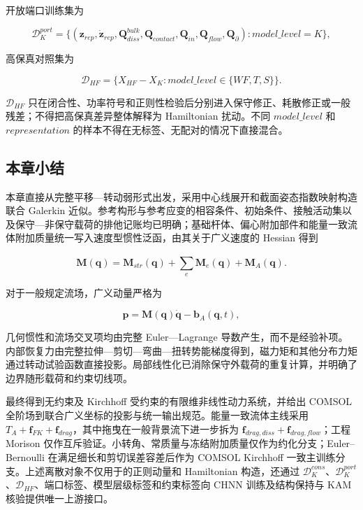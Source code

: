 开放端口训练集为

\begin{equation}
\label{eq:galerkin-2-125}
\mathcal{D}_{K}^{port} = \{\left( \mathbf{z}_{rep},{\dot{\mathbf{z}}}_{rep},\mathbf{Q}_{diss}^{bulk},\mathbf{Q}_{contact},\mathbf{Q}_{in},\mathbf{Q}_{flow},\mathbf{Q}_{\partial} \right):model\_ level = K\},
\end{equation}

高保真对照集为

\begin{equation}
\label{eq:galerkin-2-126}
\mathcal{D}_{HF} = \{ X_{HF} - X_{K}:model\_ level \in \{ WF,T,S\}\}.
\end{equation}

\(\mathcal{D}_{HF}\) 只在闭合性、功率符号和正则性检验后分别进入保守修正、耗散修正或一般残差；不得把高保真差异整体解释为 Hamiltonian 扰动。不同 \(model\_ level\) 和 \(representation\) 的样本不得在无标签、无配对的情况下直接混合。

\subsection{本章小结}\label{sec:galerkin-2-12}

本章直接从完整平移---转动弱形式出发，采用中心线展开和截面姿态指数映射构造联合 Galerkin 近似。参考构形与参考应变的相容条件、初始条件、接触活动集以及保守---非保守载荷的排他记账均已明确；基础杆体、偏心附加部件和能量一致流体附加质量统一写入速度型惯性泛函，由其关于广义速度的 Hessian 得到

\begin{equation}
\label{eq:galerkin-2-127}
\mathbf{M}\left( \mathbf{q} \right) = \mathbf{M}_{str}\left( \mathbf{q} \right) + \sum_{e}^{}\mathbf{M}_{e}\left( \mathbf{q} \right) + \mathbf{M}_{A}\left( \mathbf{q} \right).
\end{equation}

对于一般规定流场，广义动量严格为

\begin{equation}
\label{eq:galerkin-2-128}
\mathbf{p} = \mathbf{M}\left( \mathbf{q} \right)\dot{\mathbf{q}} - \mathbf{b}_{A}\left( \mathbf{q},t \right),
\end{equation}

几何惯性和流场交叉项均由完整 Euler---Lagrange 导数产生，而不是经验补项。内部恢复力由完整拉伸---剪切---弯曲---扭转势能梯度得到，磁力矩和其他分布力矩通过转动试验函数直接投影。局部线性化已消除保守外载荷的重复计算，并明确了边界随形载荷和约束切线项。

最终得到无约束及 Kirchhoff 受约束的有限维非线性动力系统，并给出 COMSOL 全阶场到联合广义坐标的投影与统一输出规范。能量一致流体主线采用 \(T_{A} + \mathbf{f}_{FK} + \mathbf{f}_{drag}\)，其中拖曳在一般背景流下进一步拆为 \(\mathbf{f}_{drag,diss} + \mathbf{f}_{drag,flow}\)；工程 Morison 仅作互斥验证。小转角、常质量与冻结附加质量仅作为约化分支；Euler--Bernoulli 在满足细长和剪切误差容差后作为 COMSOL Kirchhoff 一致主训练分支。上述离散对象不仅用于的正则动量和 Hamiltonian 构造，还通过 \(\mathcal{D}_{K}^{cons}\)、\(\mathcal{D}_{K}^{port}\)、\(\mathcal{D}_{HF}\)、端口标签、模型层级标签和约束标签向 CHNN 训练及结构保持与 KAM 核验提供唯一上游接口。
